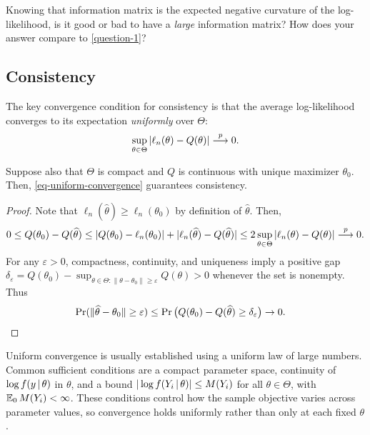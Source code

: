\documentclass[a4paper,12pt]{article}
\begin{document}
\begin{question}\label{question-2}
	Knowing that information matrix is the expected negative curvature of the log-likelihood,
	is it good or bad to have a \emph{large} information matrix?
	How does your answer compare to \autoref{question-1}?
\end{question}

\subsection{Consistency}

The key convergence condition for consistency is that the average log-likelihood
converges to its expectation \emph{uniformly} over $\Theta$:
\begin{align}\label{eq-uniform-convergence}
	\sup_{\theta\in\Theta}\left|\ell_n(\theta)-Q(\theta)\right|\overset{p}{\longrightarrow} 0.
\end{align}
\begin{proposition}\label{prop-mle-consistency}
	Suppose also that $\Theta$ is compact and $Q$ is continuous with unique maximizer $\theta_0$.
	Then, \eqref{eq-uniform-convergence} guarantees consistency.
\end{proposition}
\begin{proof}
	Note that $\ell_n(\widehat\theta)\ge\ell_n(\theta_0)$ by definition of $\widehat\theta$.
	Then,
	\begin{align*}
		0\le Q(\theta_0)-Q(\widehat\theta)
		\le |Q(\theta_0)-\ell_n(\theta_0)|
		+|\ell_n(\widehat\theta)-Q(\widehat\theta)| 
		\le 2\sup_{\theta\in\Theta}|\ell_n(\theta)-Q(\theta)|\overset{p}{\longrightarrow} 0.
	\end{align*}
	For any $\varepsilon>0$, compactness, continuity, and uniqueness imply a positive gap
	$\delta_\varepsilon=Q(\theta_0)-\sup_{\theta\in\Theta:\|\theta-\theta_0\|\ge\varepsilon}Q(\theta)>0$
	whenever the set is nonempty.
	Thus
	\begin{align*}
		\Pr(\|\widehat\theta-\theta_0\|\ge\varepsilon)
		&\le \Pr\big(Q(\theta_0)-Q(\widehat\theta)\ge\delta_\varepsilon\big)\to 0.
		\qedhere
	\end{align*}
\end{proof}

\begin{remark}
	Uniform convergence is usually established using a uniform law of large numbers.
	Common sufficient conditions are a compact parameter space, continuity of $\log f(y\mathpunct{}|\mathpunct{}\theta)$ in $\theta$,
	and a bound $|\log f(Y_i\mathpunct{}|\mathpunct{}\theta)|\le M(Y_i)$ for all $\theta\in\Theta$, with $\operatorname{\mathbb{E}}_0M(Y_i)<\infty$.
	These conditions control how the sample objective varies across parameter values,
	so convergence holds uniformly rather than only at each fixed $\theta$.
\end{remark}
\end{document}
